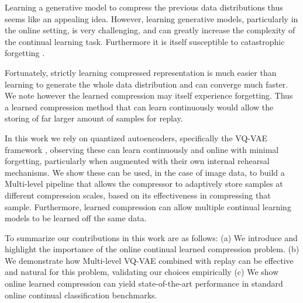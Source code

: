\documentclass[colorinlistoftodos]{article} %
\begin{document}
Learning a generative model to compress the previous data distributions thus seems like an appealing idea. However, learning generative models, particularly in the online setting, is very challenging, and can greatly increase the complexity of the continual learning task. Furthermore it is itself susceptible to catastrophic forgetting \cite{aljundi2019online}.

Fortunately, strictly learning compressed representation is much easier than learning to generate the whole data distribution and can converge much faster. We note however the learned compression may itself experience forgetting. Thus a learned compression method that can learn continuously would allow the storing of far larger amount of samples for replay.


In this work we rely on quantized autoencoders, specifically the VQ-VAE framework \cite{VQVAE}, observing these can learn continuously and online with minimal forgetting, particularly when augmented with their own internal rehearsal mechanisms. We show these can be used, in the case of image data, to build a Multi-level pipeline that allows the compressor to adaptively store samples at different compression scales, based on its effectiveness in compressing that sample. Furthermore, learned compression can allow multiple continual learning models to be learned off the same data. 

To summarize our contributions in this work are as follows: (a) We introduce and highlight the importance of the online continual learned compression problem. (b) We demonstrate how Multi-level VQ-VAE combined with replay can be effective and natural for this problem, validating our choices empirically (c) We show online learned compression can yield state-of-the-art performance in standard online continual classification benchmarks.

\end{document}
